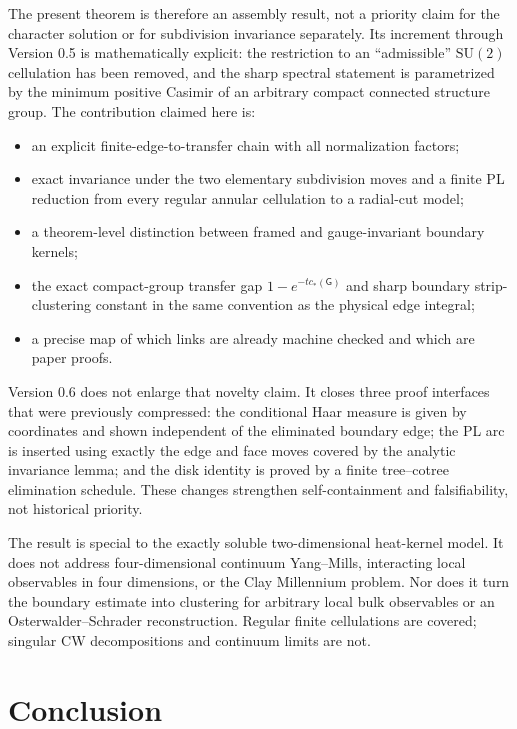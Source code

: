 \documentclass[11pt]{article}
\theoremstyle{remark}
\newcommand{\SU}{\mathrm{SU}(2)}
\newcommand{\G}{\mathsf G}
\begin{document}
The present theorem is therefore an assembly result, not a priority claim for
the character solution or for subdivision invariance separately.  Its
increment through Version 0.5 is mathematically explicit: the restriction to an
``admissible'' $\SU$ cellulation has been removed, and the sharp spectral
statement is parametrized by the minimum positive Casimir of an arbitrary
compact connected structure group.  The contribution claimed here is:\par
\begin{itemize}[leftmargin=7mm,topsep=4pt,itemsep=3pt]
\item an explicit finite-edge-to-transfer chain with all normalization factors;
\item exact invariance under the two elementary subdivision moves and a finite
PL reduction from every regular annular cellulation to a radial-cut model;
\item a theorem-level distinction between framed and gauge-invariant boundary
kernels;
\item the exact compact-group transfer gap $1-e^{-tc_*(\G)}$ and sharp boundary
strip-clustering constant in the same convention as the physical edge integral;
\item a precise map of which links are already machine checked and which are
paper proofs.
\end{itemize}

Version 0.6 does not enlarge that novelty claim.  It closes three proof
interfaces that were previously compressed: the conditional Haar measure is
given by coordinates and shown independent of the eliminated boundary edge;
the PL arc is inserted using exactly the edge and face moves covered by the
analytic invariance lemma; and the disk identity is proved by a finite
tree--cotree elimination schedule.  These changes strengthen self-containment
and falsifiability, not historical priority.

The result is special to the exactly soluble two-dimensional heat-kernel model.
It does not address four-dimensional continuum Yang--Mills, interacting local
observables in four dimensions, or the Clay Millennium problem.  Nor does it
turn the boundary estimate into clustering for arbitrary local bulk observables
or an Osterwalder--Schrader reconstruction.  Regular finite cellulations are
covered; singular CW decompositions and continuum limits are not.

\section{Conclusion}
\end{document}

